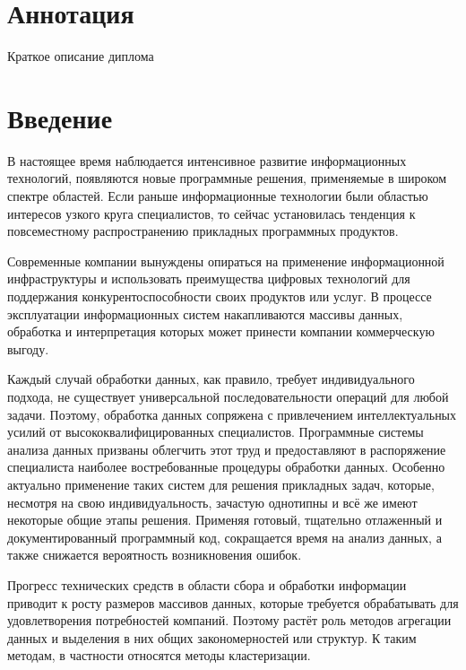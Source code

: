 \documentclass[12pt]{diploma}
\begin{document}
	\begin{titlepage}
		
	\end{titlepage}
	
	\section*{Аннотация}
		
	Краткое описание диплома
		
	
	\tableofcontents 
	
	\newpage
		
	\section{Введение}
		В настоящее время наблюдается интенсивное развитие информационных технологий, появляются новые программные решения, применяемые в широком спектре областей. Если раньше информационные технологии были областью интересов узкого круга специалистов, то сейчас установилась тенденция к повсеместному распространению прикладных программных продуктов. 
		
		Современные компании вынуждены опираться на применение информационной инфраструктуры и использовать преимущества цифровых технологий для поддержания конкурентоспособности своих продуктов или услуг. В процессе эксплуатации информационных систем накапливаются массивы данных, обработка и интерпретация которых может принести компании коммерческую выгоду. 
		
		Каждый случай обработки данных, как правило, требует индивидуального подхода, не существует универсальной последовательности операций для любой задачи. Поэтому, обработка данных сопряжена с привлечением интеллектуальных усилий от высококвалифицированных специалистов. Программные системы анализа данных призваны облегчить этот труд и предоставляют в распоряжение специалиста наиболее востребованные процедуры обработки данных. Особенно актуально применение таких систем для решения прикладных задач, которые, несмотря на свою индивидуальность, зачастую однотипны и всё же имеют некоторые общие этапы решения. Применяя готовый, тщательно отлаженный и документированный программный код, сокращается время на анализ данных, а также снижается вероятность возникновения ошибок. 

		Прогресс технических средств в области сбора и обработки информации приводит к росту размеров массивов данных, которые требуется обрабатывать для удовлетворения потребностей компаний. Поэтому растёт роль методов агрегации данных и выделения в них общих закономерностей или структур. К таким методам, в частности относятся методы кластеризации. 
		
\end{document}
